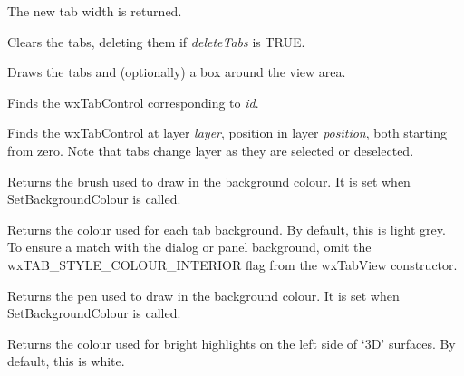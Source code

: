 The new tab width is returned.



Clears the tabs, deleting them if {\it deleteTabs} is TRUE.



Draws the tabs and (optionally) a box around the view area.



Finds the wxTabControl corresponding to {\it id}.



Finds the wxTabControl at layer {\it layer}, position in layer {\it position}, both starting from
zero. Note that tabs change layer as they are selected or deselected.



Returns the brush used to draw in the background colour. It is set when
SetBackgroundColour is called. 



Returns the colour used for each tab background. By default, this is
light grey. To ensure a match with the dialog or panel background, omit
the wxTAB\_STYLE\_COLOUR\_INTERIOR flag from the wxTabView constructor. 



Returns the pen used to draw in the background colour. It is set when
SetBackgroundColour is called. 



Returns the colour used for bright highlights on the left side of `3D' surfaces. By default, this is white.

